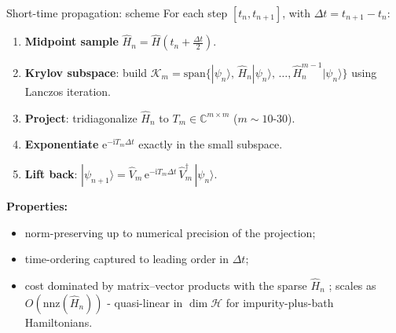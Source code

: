 \documentclass[10pt,aspectratio=169]{beamer}
\begin{document}
\begin{frame}{Short-time propagation: scheme}
  \small
  For each step $[t_n,t_{n+1}]$, with $\Delta t = t_{n+1}-t_n$:
  \begin{enumerate}
    \item \textbf{Midpoint sample}
          $\hat H_n = \hat H\!\left(t_n + \tfrac{\Delta t}{2}\right)$.
    \item \textbf{Krylov subspace}: build
          $\mathcal{K}_m = \mathrm{span}\{|\psi_n\rangle,\,\hat H_n|\psi_n\rangle,\,\dots,
                                  \hat H_n^{m-1}|\psi_n\rangle\}$
          using Lanczos iteration.
    \item \textbf{Project}: tridiagonalize $\hat H_n$ to
          $T_m \in \mathbb{C}^{m\times m}$ ($m\sim 10\text{-}30$).
    \item \textbf{Exponentiate} $\mathrm{e}^{-\mathrm{i} T_m \Delta t}$
          exactly in the small subspace.
    \item \textbf{Lift back}:
          $|\psi_{n+1}\rangle = \hat V_m\, \mathrm{e}^{-\mathrm{i} T_m \Delta t}\,
            \hat V_m^\dagger\,|\psi_n\rangle$.
  \end{enumerate}

  \medskip
  \textbf{Properties:}
  \begin{itemize}
    \item norm-preserving up to numerical precision of the projection;
    \item time-ordering captured to leading order in $\Delta t$;
    \item cost dominated by matrix–vector products with the sparse $\hat H_n$
            ; scales as $O(\mathrm{nnz}(\hat H_n))$ - quasi-linear in $\dim\mathcal H$
            for impurity-plus-bath Hamiltonians.
  \end{itemize}
\end{frame}
\end{document}
